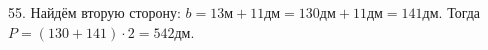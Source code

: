 55. Найдём вторую сторону: $b=13\text{м}+11\text{дм}=130\text{дм}+11\text{дм}=141$дм. Тогда $P=(130+141)\cdot2=542$дм.\\
